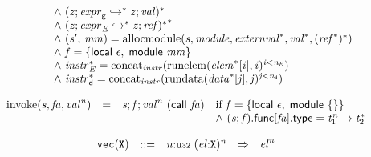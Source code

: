 $$\begin{array}{@{}lcl@{}l@{}}
 &&&\quad {\land}~({\mathit{z}} ; {\mathit{expr}}_{{\mathsf{g}}} \hookrightarrow^\ast {\mathit{z}} ; {\mathit{val}})^\ast \\
 &&&\quad {\land}~{({\mathit{z}} ; {\mathit{expr}}_{{\mathit{E}}} \hookrightarrow^\ast {\mathit{z}} ; {\mathit{ref}})^\ast}^\ast \\
 &&&\quad {\land}~({\mathit{s}'},\, {\mathit{mm}}) = {\mathrm{allocmodule}}({\mathit{s}}, {\mathit{module}}, {{\mathit{externval}}^\ast}, {{\mathit{val}}^\ast}, {({{\mathit{ref}}^\ast})^\ast}) \\
 &&&\quad {\land}~{\mathit{f}} = \{ \begin{array}[t]{@{}l@{}}
\mathsf{local}~\epsilon,\; \mathsf{module}~{\mathit{mm}} \}\end{array} \\
 &&&\quad {\land}~{{\mathit{instr}}_{{\mathit{E}}}^\ast} = {{\mathrm{concat}}}_{{\mathit{instr}}}({{\mathrm{runelem}}({{\mathit{elem}}^\ast}{}[{\mathit{i}}], {\mathit{i}})^{{\mathit{i}}<{\mathit{n}}_{{\mathit{E}}}}}) \\
 &&&\quad {\land}~{{\mathit{instr}}_{{\mathsf{d}}}^\ast} = {{\mathrm{concat}}}_{{\mathit{instr}}}({{\mathrm{rundata}}({{\mathit{data}}^\ast}{}[{\mathit{j}}], {\mathit{j}})^{{\mathit{j}}<{\mathit{n}}_{{\mathsf{d}}}}}) \\
\end{array}
$$

\vspace{1ex}

$$
\begin{array}{@{}lcl@{}l@{}}
{\mathrm{invoke}}({\mathit{s}}, {\mathit{fa}}, {{\mathit{val}}^{{\mathit{n}}}}) &=& {\mathit{s}} ; {\mathit{f}} ; {{\mathit{val}}^{{\mathit{n}}}}~(\mathsf{call}~{\mathit{fa}}) &\quad
  \mbox{if}~{\mathit{f}} = \{ \begin{array}[t]{@{}l@{}}
\mathsf{local}~\epsilon,\; \mathsf{module}~\{ \begin{array}[t]{@{}l@{}}
 \}\end{array} \}\end{array} \\
 &&&\quad {\land}~({\mathit{s}} ; {\mathit{f}}).\mathsf{func}{}[{\mathit{fa}}].\mathsf{type} = {{\mathit{t}}_{{1}}^{{\mathit{n}}}} \rightarrow {{\mathit{t}}_{{2}}^\ast} \\
\end{array}
$$

\vspace{1ex}

$$
\begin{array}{@{}l@{}rrlll@{}l@{}}
& {\mathtt{vec}}({\mathtt{X}}) &::=& {\mathit{n}}{:}{\mathtt{u{\scriptstyle32}}}~{({\mathit{el}}{:}{\mathtt{X}})^{{\mathit{n}}}} &\Rightarrow& {{\mathit{el}}^{{\mathit{n}}}} \\
\end{array}
$$

